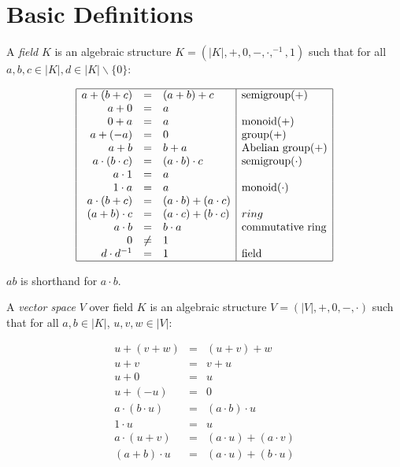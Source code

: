 \section{Basic Definitions}

\label{sec:basic-definitions}

\begin{definition}[Field]

\cite{henglein2016autodiff} A \emph{field} $K$ is an algebraic structure $K =
(|K|, +, 0, -, \cdot, ^{-1}, 1)$ such that for all $a, b, c \in |K|, d \in
|K|\backslash\{0\}$:

\[
\begin{array}{|rcl|l|} \hline
a + (b + c) & = & (a + b) + c & \text{semigroup}(+) \\
a + 0 & = & a & \\
0 + a & = & a & \text{monoid}(+) \\
a + (-a) & = & 0 & \text{group}(+) \\
a + b & = & b + a & \text{Abelian group}(+) \\
a \cdot (b \cdot c) & = & (a \cdot b) \cdot c & \text{semigroup}(\cdot) \\
a \cdot 1 & = & a & \\
1 \cdot a & = & a & \text{monoid}(\cdot) \\
a \cdot (b + c) & = & (a \cdot b) + (a \cdot c) & \\
(a + b) \cdot c & = & (a \cdot c) + (b \cdot c) & ring \\
a \cdot b & = & b \cdot a & \text{commutative ring} \\
0 & \neq & 1 & \\
d \cdot d^{-1} & = & 1 & \text{field} \\ \hline
\end{array}
\]
\end{definition}

\begin{notation}

$ab$ is shorthand for $a \cdot b$.

\end{notation}

\begin{definition}

\cite{henglein2016autodiff} A \emph{vector space} $V$ over field $K$ is an
algebraic structure $V = (|V|, +, 0, -, \cdot)$ such that for all $a, b \in
|K|$, $u, v, w \in |V|$:

\begin{eqnarray}
u + (v + w) & = & (u + v) + w \\
u + v & = & v + u \\
u + 0 & = & u \\
u + (-u) & = & 0 \\
a \cdot (b \cdot u) & = & (a \cdot b) \cdot u \\
1 \cdot u & = & u \\
a \cdot (u + v) & = & (a \cdot u) + (a \cdot v) \\
(a + b) \cdot u & = & (a \cdot u) + (b \cdot u) 
\end{eqnarray}
\end{definition}

